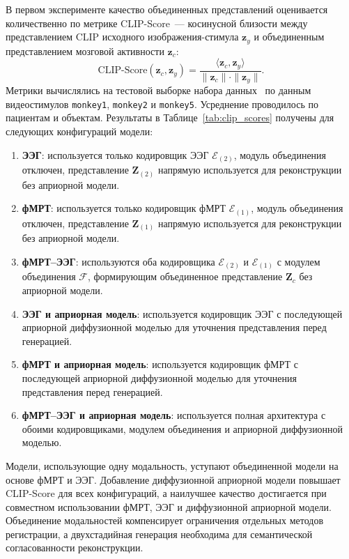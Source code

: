 В первом эксперименте качество объединенных представлений оценивается количественно по метрике CLIP-Score~--- косинусной близости между представлением CLIP исходного изображения-стимула $\mathbf{z}_y$ и объединенным представлением мозговой активности $\mathbf{z}_c$:
\begin{equation}\label{eq:clip_score}
    \text{CLIP-Score}(\mathbf{z}_c, \mathbf{z}_y) = \frac{\langle \mathbf{z}_c, \mathbf{z}_y \rangle}{\| \mathbf{z}_c \| \cdot \| \mathbf{z}_y \|}.
\end{equation}
Метрики вычислялись на тестовой выборке набора данных~\cite{Telesford2023} по данным видеостимулов \texttt{monkey1}, \texttt{monkey2} и \texttt{monkey5}. Усреднение проводилось по пациентам и объектам. Результаты в Таблице~\ref{tab:clip_scores} получены для следующих конфигураций модели:
\begin{enumerate}
    \item \textbf{ЭЭГ}: используется только кодировщик ЭЭГ $\mathcal{E}_{(2)}$, модуль объединения отключен, представление $\mathbf{Z}_{(2)}$ напрямую используется для реконструкции без априорной модели.
    \item \textbf{фМРТ}: используется только кодировщик фМРТ $\mathcal{E}_{(1)}$, модуль объединения отключен, представление $\mathbf{Z}_{(1)}$ напрямую используется для реконструкции без априорной модели.
    \item \textbf{фМРТ--ЭЭГ}: используются оба кодировщика $\mathcal{E}_{(2)}$ и $\mathcal{E}_{(1)}$ с модулем объединения $\mathcal{F}$, формирующим объединенное представление $\mathbf{Z}_c$ без априорной модели.
    \item \textbf{ЭЭГ и априорная модель}: используется кодировщик ЭЭГ с последующей априорной диффузионной моделью для уточнения представления перед генерацией.
    \item \textbf{фМРТ и априорная модель}: используется кодировщик фМРТ с последующей априорной диффузионной моделью для уточнения представления перед генерацией.
    \item \textbf{фМРТ--ЭЭГ и априорная модель}: используется полная архитектура с обоими кодировщиками, модулем объединения и априорной диффузионной моделью.
\end{enumerate}

Модели, использующие одну модальность, уступают объединенной модели на основе фМРТ и ЭЭГ. Добавление диффузионной априорной модели повышает CLIP-Score для всех конфигураций, а наилучшее качество достигается при совместном использовании фМРТ, ЭЭГ и диффузионной априорной модели. Объединение модальностей компенсирует ограничения отдельных методов регистрации, а двухстадийная генерация необходима для семантической согласованности реконструкции.

